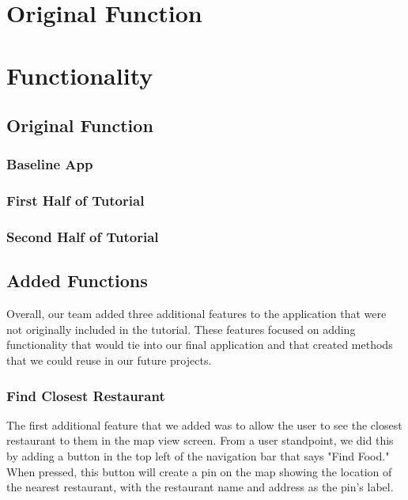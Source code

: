 \documentclass[conference]{IEEEtran}
\begin{document}
\section{Original Function}

\section{Functionality}

\subsection{Original Function}

\subsubsection{Baseline App}

\subsubsection{First Half of Tutorial}

\subsubsection{Second Half of Tutorial}

\subsection{Added Functions}
Overall, our team added three additional features to the application that were not 
originally included in the tutorial. These features focused on adding functionality
that would tie into our final application and that created methods that we could
reuse in our future projects.

\subsubsection{Find Closest Restaurant}
The first additional feature that we added was to allow the user to see the closest
restaurant to them in the map view screen. From a user standpoint, we did this by 
adding a button in the top left of the navigation bar that says "Find Food." When 
pressed, this button will create a pin on the map showing the location of the nearest
restaurant, with the restaurant name and address as the pin's label.
\end{document}
